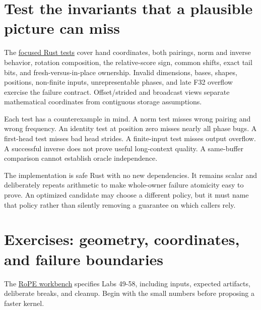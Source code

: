 \section{Test the invariants that a plausible picture can
miss}\label{test-the-invariants-that-a-plausible-picture-can-miss}

The
\href{https://github.com/hermonai/inside-the-llm-engine/blob/astra-visual-rewrite/code/mini-engine/crates/engine0/tests/rope.rs}{focused
Rust tests} cover hand coordinates, both pairings, norm and inverse
behavior, rotation composition, the relative-score sign, common shifts,
exact tail bits, and fresh-versus-in-place ownership. Invalid
dimensions, bases, shapes, positions, non-finite inputs, unrepresentable
phases, and late F32 overflow exercise the failure contract.
Offset/strided and broadcast views separate mathematical coordinates
from contiguous storage assumptions.

Each test has a counterexample in mind. A norm test misses wrong pairing
and wrong frequency. An identity test at position zero misses nearly all
phase bugs. A first-head test misses bad head strides. A finite-input
test misses output overflow. A successful inverse does not prove useful
long-context quality. A same-buffer comparison cannot establish oracle
independence.

The implementation is safe Rust with no new dependencies. It remains
scalar and deliberately repeats arithmetic to make whole-owner failure
atomicity easy to prove. An optimized candidate may choose a different
policy, but it must name that policy rather than silently removing a
guarantee on which callers rely.

\section{Exercises: geometry, coordinates, and failure
boundaries}\label{exercises-geometry-coordinates-and-failure-boundaries}

The
\href{https://github.com/hermonai/inside-the-llm-engine/blob/astra-visual-rewrite/labs/lab-49-rope-position-workbench.md}{RoPE
workbench} specifies Labs 49-58, including inputs, expected artifacts,
deliberate breaks, and cleanup. Begin with the small numbers before
proposing a faster kernel.

